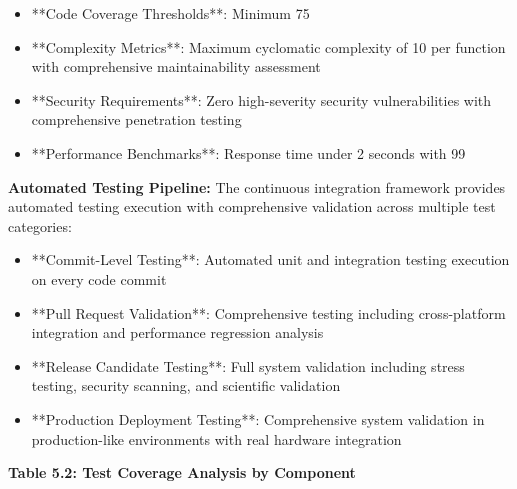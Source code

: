 \documentclass[12pt,a4paper]{report}
\begin{document}
\begin{itemize}
\item **Code Coverage Thresholds**: Minimum 75%
\item **Complexity Metrics**: Maximum cyclomatic complexity of 10 per function with comprehensive maintainability assessment
\item **Security Requirements**: Zero high-severity security vulnerabilities with comprehensive penetration testing
\item **Performance Benchmarks**: Response time under 2 seconds with 99%

\end{itemize}
\textbf{Automated Testing Pipeline:}
The continuous integration framework provides automated testing execution with comprehensive validation across multiple
test categories:

\begin{itemize}
\item **Commit-Level Testing**: Automated unit and integration testing execution on every code commit
\item **Pull Request Validation**: Comprehensive testing including cross-platform integration and performance regression
  analysis
\item **Release Candidate Testing**: Full system validation including stress testing, security scanning, and scientific
  validation
\item **Production Deployment Testing**: Comprehensive system validation in production-like environments with real hardware
  integration

\end{itemize}
\textbf{Table 5.2: Test Coverage Analysis by Component}
\end{document}
